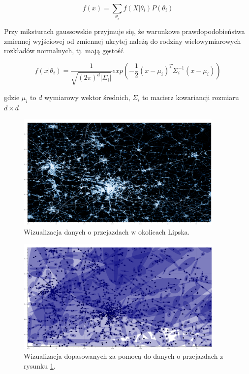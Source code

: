 $$f(x) = \sum_{\theta_i} f(X | \theta_i) P(\theta_i)$$

Przy miksturach gaussowskie przyjmuje się, że warunkowe prawdopodobieństwa zmiennej wyjściowej od zmiennej ukrytej
należą do rodziny wielowymiarowych rozkładów normalnych, tj. mają gęstość

$$f(x | \theta_i) = \frac{1}{\sqrt{(2 \pi)^d |\Sigma_i|}} exp(-\frac{1}{2} (x - \mu_i)^T \Sigma_i^{-1} (x - \mu_i))$$

gdzie $\mu_i$ to $d$ wymiarowy wektor średnich, $\Sigma_i$ to macierz kowariancji rozmiaru $d \times d$

\begin{figure}[H]
    \centering
    \includegraphics[width=0.9\textwidth]{images/2_2_a_leipzig_datashader}
    \caption{Wizualizacja  danych o przejazdach w okolicach Lipska.}
    \label{fig:2_2_a_leipzig_datashader}
\end{figure}

\begin{figure}[H]
    \centering
    \includegraphics[width=0.9\textwidth]{images/2_2_a_leipzig_gmm}
    \caption{Wizualizacja  dopasowanych za pomocą  do danych o przejazdach z rysunku \ref{fig:2_2_a_leipzig_datashader}.}
    \label{fig:2_2_a_leipzig_gmm}
\end{figure}

